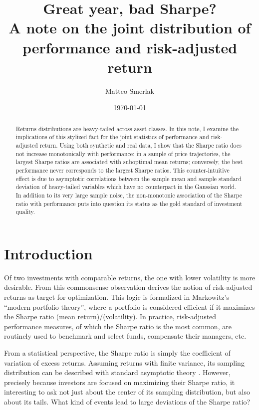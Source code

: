 \documentclass[
reprint,
amsmath,amssymb,
aps,
]{revtex4-2}
\begin{document}
\title{Great year, bad Sharpe?\\ A note on the joint distribution of performance and risk-adjusted return}

\author{Matteo Smerlak}

\date{\today}

\begin{abstract}
    Returns distributions are heavy-tailed across asset classes. 
    In this note, I examine the implications of this stylized fact for the joint statistics of performance and risk-adjusted return. 
    Using both synthetic and real data, I show that the Sharpe ratio does not increase monotonically with performance: in a sample of price trajectories, the largest Sharpe ratios are associated with suboptimal mean returns; conversely, the best performance never corresponds to the largest Sharpe ratios. 
    This counter-intuitive effect is due to asymptotic correlations between the sample mean and sample standard deviation of heavy-tailed variables which have no counterpart in the Gaussian world. 
    In addition to its very large sample noise, the non-monotonic association of the Sharpe ratio with performance puts into question its status as the gold standard of investment quality. 
 \end{abstract}

\maketitle 

\section{Introduction}

Of two investments with comparable returns, the one with lower volatility is more desirable. 
From this commonsense observation derives the notion of risk-adjusted returns as target for optimization. 
This logic is formalized in Markowitz's ``modern portfolio theory'', where a portfolio is considered efficient if it maximizes the Sharpe ratio (mean return)/(volatility). 
In practice, risk-adjusted performance measures, of which the Sharpe ratio is the most common, are routinely used to benchmark and select funds, compensate their managers, etc.

From a statistical perspective, the Sharpe ratio is simply the coefficient of variation of excess returns. 
Assuming returns with finite variance, its sampling distribution can be described with standard asymptotic theory \cite{loStatistics2002}. 
However, precisely because investors are focused on maximizing their Sharpe ratio, it interesting to ask not just about the center of its sampling distribution, but also about its tails. 
What kind of events lead to large deviations of the Sharpe ratio? 
\end{document}
